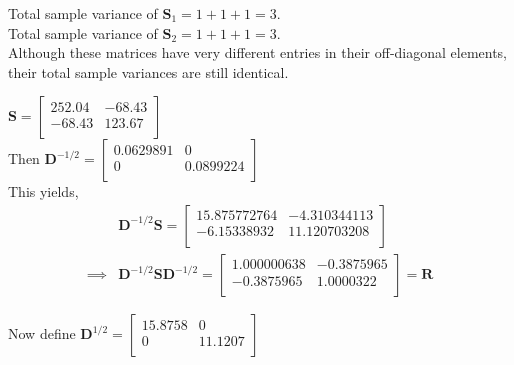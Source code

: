 \documentclass[12pt]{article}
\newenvironment{problem}[2][Problem]{\begin{trivlist}
\item[\hskip \labelsep {\bfseries #1}\hskip \labelsep {\bfseries #2.}]}{\end{trivlist}}
\newcommand{\vct}{\mathbf}
\begin{document}
\begin{problem}{3.7}
\end{problem}

\begin{problem}{3.8a}
\end{problem}

Total sample variance of $\vct{S}_1 = 1 + 1 + 1 = 3$.\\

Total sample variance of $\vct{S}_2 = 1 + 1 + 1 = 3$.\\

Although these matrices have very different entries in their off-diagonal elements, their total sample variances are still identical.

\begin{problem}{3.11}
\end{problem}

$\vct{S} = \begin{bmatrix}
    252.04       & -68.43 \\
    -68.43       & 123.67 \\
\end{bmatrix}$\\

Then $\vct{D}^{-1/2} = \begin{bmatrix}
    0.0629891       & 0 \\
    0       & 0.0899224 \\
\end{bmatrix}$\\

This yields,
\begin{align*}
&\vct{D}^{-1/2}\vct{S} = \begin{bmatrix}
   15.875772764       & -4.310344113 \\
    -6.15338932       & 11.120703208 \\
\end{bmatrix}\\
\implies &\vct{D}^{-1/2}\vct{S}\vct{D}^{-1/2} = \begin{bmatrix}
   1.000000638       & -0.3875965 \\
    -0.3875965       & 1.0000322 \\
\end{bmatrix} = \vct{R}
\end{align*}

Now define $\vct{D}^{1/2} = \begin{bmatrix}
    15.8758       & 0 \\
    0       & 11.1207 \\
\end{bmatrix}$\\
\end{document}
